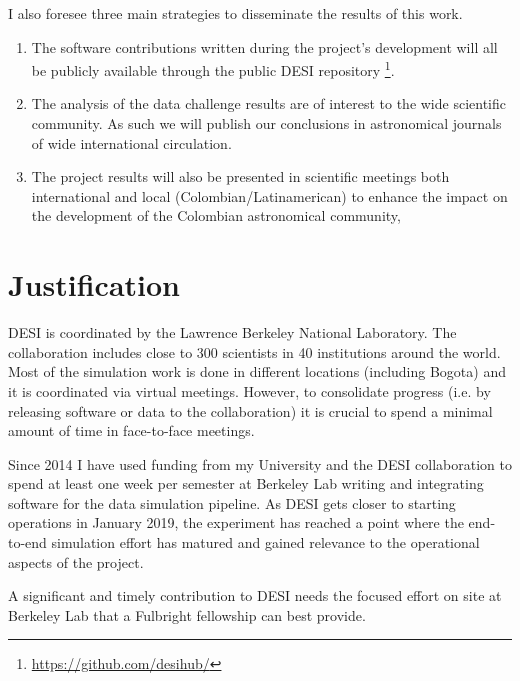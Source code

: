 \documentclass[12pt]{article}
\begin{document}
\noindent
I also foresee three main strategies to disseminate the results of this
work.
\begin{enumerate}
\item The software contributions written during the project's
development will all be publicly available through the public DESI
repository \footnote{\url{https://github.com/desihub/}}.  


\item The analysis of the data challenge results are of interest to
the wide scientific community. As such we will publish our conclusions
in astronomical journals of wide international circulation. 

\item The project results will also be presented in scientific
meetings both international and local (Colombian/Latinamerican) 
to enhance the impact on the development of the Colombian astronomical
community,  
\end{enumerate}



\section*{Justification}

DESI is coordinated by the Lawrence Berkeley National Laboratory. The
collaboration includes close to 300 scientists in 40 institutions
around the world. 
Most of the simulation work is done in different locations (including
Bogota) and it is coordinated via virtual meetings.  
However, to consolidate progress (i.e. by releasing software or data
to the collaboration) it is crucial to spend a minimal amount of time
in face-to-face meetings. 

Since 2014 I have used funding from my University and the DESI
collaboration to spend at least one week per semester at
Berkeley Lab writing and integrating software for the data simulation
pipeline. 
As DESI gets closer to starting operations in January 2019, the
experiment has reached a point where the end-to-end simulation effort
has matured and gained relevance to the operational aspects of the
project. 

A significant and timely contribution to DESI needs the focused effort on
site at Berkeley Lab that a Fulbright fellowship can best provide. 
\end{document}
